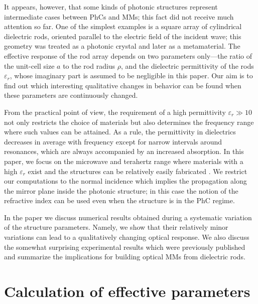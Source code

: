 \documentclass[letterpaper,12pt]{report}
\begin{document}
It appears, however, that some kinds of photonic structures represent intermediate cases
between PhCs and MMs; this fact did not receive much attention so far. One of the
simplest examples is a square array of cylindrical dielectric rods, oriented parallel to
the electric field of the incident wave; this geometry was treated as a photonic
crystal\cite{plihal1991two} and later as a metamaterial\cite{zhao2009mie,Vynck2009, felbacq2009}. The
effective response of the rod array depends on two parameters only---the ratio of the
unit-cell size $a$ to the rod radius $\rho$, and the dielectric permittivity of the rods
$\varepsilon_r$, whose imaginary part is assumed to be negligible in this paper. Our aim is to
find out which interesting qualitative changes in behavior can be found when these parameters
are continuously changed.

From the practical point of view, the requirement of a high permittivity $\varepsilon_r
\gg 10$ not only restricts the choice of materials but also determines the frequency
range where such values can be attained. 
\cite{zhao2008tunable,zhao2008experimental}
As a rule, the permittivity in dielectrics
decreases in average with frequency except for narrow intervals around resonances, which
are always accompanied by an increased absorption. In this paper, we focus on the microwave and terahertz
range where materials with a high $\varepsilon_r$ exist and the structures can be relatively easily fabricated
\cite{nemec2012resonant,nemec2009tunable}. We restrict our computations to the normal
incidence which implies the propagation along the mirror plane inside the photonic
structure; in this case the notion of the refractive index can be used even when the
structure is in the PhC regime.

In the paper we discuss numerical results obtained during a systematic variation of the
structure parameters. Namely, we show that their relatively minor variations can lead to
a qualitatively changing optical response. We also discuss the somewhat surprising experimental 
results which were previously published  \cite{peng2007}
and summarize the implications for building optical MMs from dielectric rods.

\section{Calculation of effective parameters}
\end{document}
